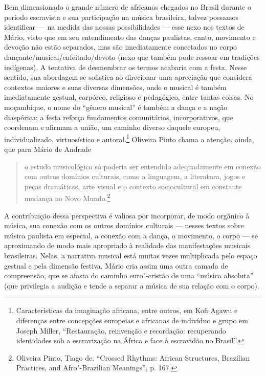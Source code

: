 Bem dimensionado o grande número de
africanos chegados no Brasil durante o período escravista e sua
participação na música brasileira, talvez possamos identificar --- na
medida das nossas possibilidades --- esse nexo nos textos de Mário, visto
que em seu entendimento das danças paulistas, canto, movimento e devoção
não estão separados, mas são imediatamente conectados no corpo
dançante/musical/enfeitado/devoto (nexo que também pode ressoar em
tradições indígenas). A tentativa de desmembrar os termos acabaria com a
festa. Nesse sentido, sua abordagem se sofistica ao direcionar uma
apreciação que considera contextos maiores e suas diversas dimensões,
onde o musical é também imediatamente gestual, corpóreo, religioso e
pedagógico, entre tantas coisas. No moçambique, o nome do ``gênero
musical'' é também a dança e a nação diaspórica; a festa reforça
fundamentos comunitários, incorporativos, que coordenam e afirmam a
união, um caminho diverso daquele europeu, individualizado,
virtuosístico e autoral.\footnote{Características da imaginação
  africana, entre outros, em Kofi Agawu e diferenças entre concepções
  europeias e africanas de indivíduo e grupo em Joseph Miller,
  ``Restauração, reinvenção e recordação: recuperando identidades sob a
  escravização na África e face à escravidão no Brasil''.}
Oliveira Pinto chama a atenção, ainda, que para Mário de Andrade

\begin{quote}
o estudo musicológico só poderia ser entendido adequadamente em conexão
com outros domínios culturais, como a linguagem, a literatura, jogos e
peças dramáticas, arte visual e o contexto sociocultural em constante
mudança no Novo Mundo.\footnote{Oliveira Pinto, Tiago de. ``Crossed
  Rhythms: African Structures, Brazilian Practices, and Afro"-Brazilian
  Meanings'', p. 167.}
\end{quote}

A contribuição dessa perspectiva é valiosa por incorporar, de modo
orgânico à música, sua conexão com os outros domínios culturais ---
nesses textos sobre música paulista em especial, a conexão com a dança,
o movimento, o corpo --- se aproximando de modo mais apropriado à
realidade das manifestações musicais brasileiras. Nelas, a narrativa
musical está muitas vezes multiplicada pelo espaço gestual e pela
dimensão festiva. Mário cria assim uma outra camada de compreensão, que
se afasta do caminho euro"-cristão de uma ``música absoluta'' (que
privilegia a audição e tende a separar a música de sua relação com o
corpo).

